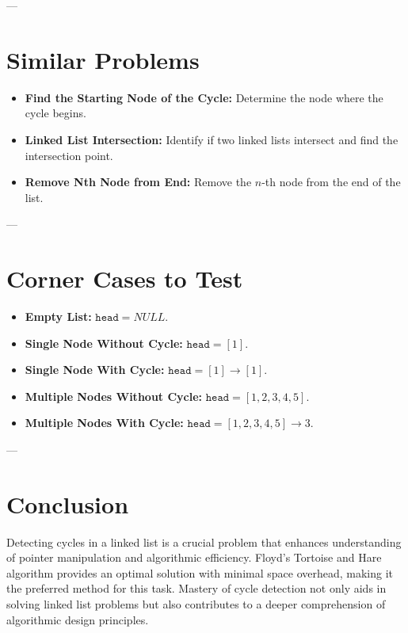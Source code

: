 ---

\section*{Similar Problems}
\begin{itemize}
    \item \textbf{Find the Starting Node of the Cycle:} Determine the node where the cycle begins.
    \item \textbf{Linked List Intersection:} Identify if two linked lists intersect and find the intersection point.
    \item \textbf{Remove Nth Node from End:} Remove the \(n\)-th node from the end of the list.
\end{itemize}

---

\section*{Corner Cases to Test}
\begin{itemize}
    \item \textbf{Empty List:} \(\texttt{head} = NULL\).
    \item \textbf{Single Node Without Cycle:} \(\texttt{head} = [1]\).
    \item \textbf{Single Node With Cycle:} \(\texttt{head} = [1] \rightarrow [1]\).
    \item \textbf{Multiple Nodes Without Cycle:} \(\texttt{head} = [1, 2, 3, 4, 5]\).
    \item \textbf{Multiple Nodes With Cycle:} \(\texttt{head} = [1, 2, 3, 4, 5] \rightarrow 3\).
\end{itemize}

---

\section*{Conclusion}
Detecting cycles in a linked list is a crucial problem that enhances understanding of pointer manipulation and algorithmic efficiency. Floyd’s Tortoise and Hare algorithm provides an optimal solution with minimal space overhead, making it the preferred method for this task. Mastery of cycle detection not only aids in solving linked list problems but also contributes to a deeper comprehension of algorithmic design principles.